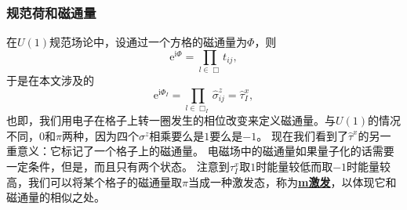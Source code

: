 \documentclass[hyperref, UTF8, a4paper]{ctexart}
\newcommand*{\ii}{\mathrm{i}}
\newcommand*{\ee}{\mathrm{e}}
\newcommand*{\concept}[1]{\underline{\textbf{#1}}}
\newcommand*{\Ztwo}{$\mathbb{Z}_2$}
\begin{document}
\subsubsection{规范荷和磁通量}

在$U(1)$规范场论中，设通过一个方格的磁通量为$\Phi$，则
\[
    \ee^{\ii \Phi} = \prod_{l \in \Box} t_{ij},
\]
于是在本文涉及的
\begin{equation}
    \ee^{\ii \Phi_I} = \prod_{l \in \Box_I} \hat{\sigma}^z_{ij} = \hat{\tau}^x_I,
\end{equation}
也即，我们用电子在格子上转一圈发生的相位改变来定义磁通量。与$U(1)$的情况不同，$0$和$\pi$两种，因为四个$\sigma^z$相乘要么是$1$要么是$-1$。
现在我们看到了$\hat{\tau}^x$的另一重意义：它标记了一个格子上的磁通量。
电磁场中的磁通量如果量子化的话需要一定条件，但是，而且只有两个状态。
注意到$\tau_I^x$取$1$时能量较低而取$-1$时能量较高，我们可以将某个格子的磁通量取$\pi$当成一种激发态，称为\concept{m激发}，以体现它和磁通量的相似之处。
\end{document}

